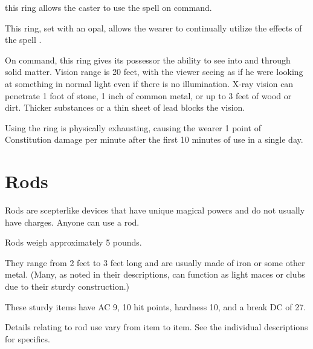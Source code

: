 
  this ring allows the caster to use the spell  on command.


 This ring, set with an opal, allows the wearer to continually utilize the effects of the spell .


 On command, this ring gives its possessor the ability to see into and through solid matter. Vision range is 20 feet, with the viewer seeing as if he were looking at something in normal light even if there is no illumination. X-ray vision can penetrate 1 foot of stone, 1 inch of common metal, or up to 3 feet of wood or dirt. Thicker substances or a thin sheet of lead blocks the vision.

Using the ring is physically exhausting, causing the wearer 1 point of Constitution damage per minute after the first 10 minutes of use in a single day.


\section{Rods}

Rods are scepterlike devices that have unique magical powers and do not usually have charges. Anyone can use a rod.

 Rods weigh approximately 5 pounds.

They range from 2 feet to 3 feet long and are usually made of iron or some other metal. (Many, as noted in their descriptions, can function as light maces or clubs due to their sturdy construction.)

These sturdy items have AC 9, 10 hit points, hardness 10, and a break DC of 27.

 Details relating to rod use vary from item to item. See the individual descriptions for specifics.

